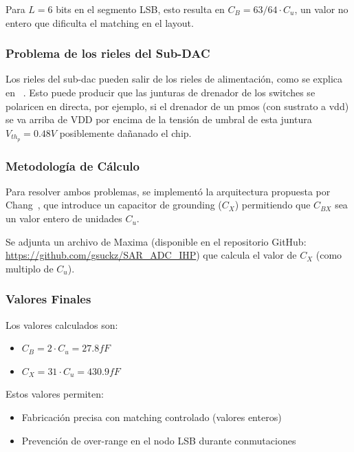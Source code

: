 \documentclass[12pt,a4paper]{report}
\begin{document}
Para $L = 6$ bits en el segmento LSB, esto resulta en $C_B = 63/64 \cdot C_u$, un valor no entero que dificulta el matching en el layout.

\subsubsection{Problema de los rieles del Sub-DAC}
Los rieles del sub-dac pueden salir de los rieles de alimentación, como se explica en ~\cite{chang_sar_thesis}. Esto puede producir que las junturas de drenador de los switches se polaricen en directa, por ejemplo, si el drenador de un pmos (con sustrato a vdd) se va arriba de VDD por encima de la tensión de umbral de esta juntura $V_{th_p}=0.48V$ posiblemente dañanado el chip.

\subsubsection{Metodología de Cálculo}

Para resolver ambos problemas, se implementó la arquitectura propuesta por Chang~\cite{chang_sar_thesis}, que introduce un capacitor de grounding ($C_X$) permitiendo que $C_{BX}$ sea un valor entero de unidades $C_u$.

Se adjunta un archivo de  Maxima (disponible en el repositorio GitHub: \url{https://github.com/gsuckz/SAR_ADC_IHP}) que calcula el valor de $C_X$ (como multiplo de $C_u$).




\subsubsection{Valores Finales}

Los valores calculados son:
\begin{itemize}
    \item $C_B = 2 \cdot C_u = 27.8 fF$
    \item $C_X = 31 \cdot C_u = 430.9 fF$
\end{itemize}

Estos valores permiten:
\begin{itemize}
    \item Fabricación precisa con matching controlado (valores enteros)
    \item Prevención de over-range en el nodo LSB durante conmutaciones
\end{itemize}
\end{document}
